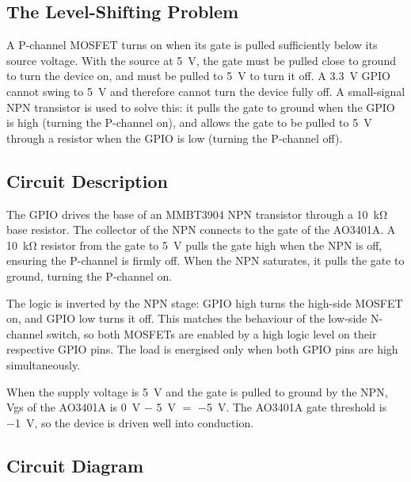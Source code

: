 \subsection{The Level-Shifting Problem}

A P-channel MOSFET turns on when its gate is pulled sufficiently below its source
voltage. With the source at \SI{+5}{\volt}, the gate must be pulled close to ground
to turn the device on, and must be pulled to \SI{+5}{\volt} to turn it off. A
\SI{3.3}{\volt} GPIO cannot swing to \SI{+5}{\volt} and therefore cannot turn the
device fully off. A small-signal NPN transistor is used to solve this: it pulls the
gate to ground when the GPIO is high (turning the P-channel on), and allows the gate
to be pulled to \SI{+5}{\volt} through a resistor when the GPIO is low (turning the
P-channel off).

\subsection{Circuit Description}

The GPIO drives the base of an MMBT3904 NPN transistor through a \SI{10}{\kilo\ohm}
base resistor. The collector of the NPN connects to the gate of the AO3401A. A
\SI{10}{\kilo\ohm} resistor from the gate to \SI{+5}{\volt} pulls the gate high
when the NPN is off, ensuring the P-channel is firmly off. When the NPN saturates,
it pulls the gate to ground, turning the P-channel on.

The logic is inverted by the NPN stage: GPIO high turns the high-side MOSFET on,
and GPIO low turns it off. This matches the behaviour of the low-side N-channel
switch, so both MOSFETs are enabled by a high logic level on their respective GPIO
pins. The load is energised only when both GPIO pins are high simultaneously.

When the supply voltage is \SI{5}{\volt} and the gate is pulled to ground by the NPN,
Vgs of the AO3401A is \SI{0}{\volt} $-$ \SI{5}{\volt} $=$ \SI{-5}{\volt}. The
AO3401A gate threshold is \SI{-1}{\volt}, so the device is driven well into
conduction.

\subsection{Circuit Diagram}

